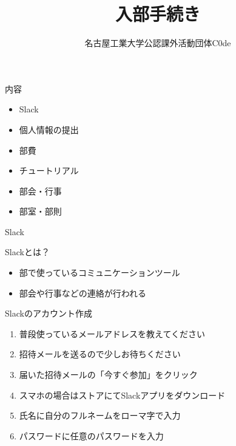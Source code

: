 \documentclass[12pt, unicode]{beamer}
\title{入部手続き}
\author{名古屋工業大学公認課外活動団体C0de}
\date{}
\begin{document}
\begin{frame}
    \maketitle
\end{frame}

\begin{frame}{内容}
    \begin{itemize}
        \item Slack
        \item 個人情報の提出
        \item 部費
        \item チュートリアル
        \item 部会・行事
        \item 部室・部則
    \end{itemize}
\end{frame}

\begin{frame}{Slack}
    \begin{block}{Slackとは？}
        \begin{itemize}
            \item 部で使っているコミュニケーションツール
            \item 部会や行事などの連絡が行われる
        \end{itemize}
    \end{block}

    \begin{block}{Slackのアカウント作成}
        \begin{enumerate}
            \item 普段使っているメールアドレスを教えてください
            \item 招待メールを送るので少しお待ちください
            \item 届いた招待メールの「今すぐ参加」をクリック
            \item スマホの場合はストアにてSlackアプリをダウンロード
            \item 氏名に自分のフルネームをローマ字で入力
            \item パスワードに任意のパスワードを入力
        \end{enumerate}
    \end{block}
\end{frame}
\end{document}

